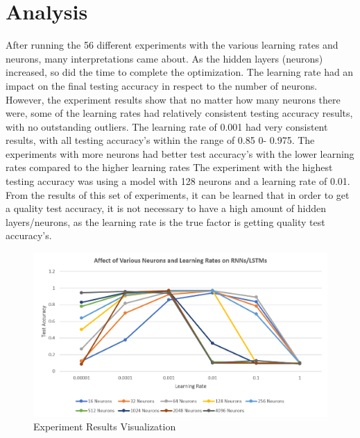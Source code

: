 \documentclass[a4paper]{article}
\begin{document}
\section{Analysis}
After running the 56 different experiments with the various learning rates and neurons, many interpretations came about. As the hidden layers (neurons) increased, so did the time to complete the optimization. The learning rate had an impact on the final testing accuracy in respect to the number of neurons. However, the experiment results show that no matter how many neurons there were, some of the learning rates had relatively consistent testing accuracy results, with no outstanding outliers. The learning rate of 0.001 had very consistent results, with all testing accuracy’s within the range of 0.85 0- 0.975. The experiments with more neurons had better test accuracy’s with the lower learning rates compared to the higher learning rates The experiment with the highest testing accuracy was using a model with 128 neurons and a learning rate of 0.01. From the results of this set of experiments, it can be learned that in order to get a quality test accuracy, it is not necessary to have a high amount of hidden layers/neurons, as the learning rate is the true factor is getting quality test accuracy’s.

\begin{figure}
   \includegraphics[width=\linewidth]{resultsGraph.png}
   \caption{ Experiment Results Visualization}
   \label{fig:results}
\end{figure}
\end{document}
